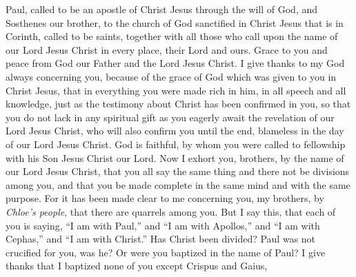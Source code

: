 
\begin{biblechapter} %
 Paul, called to be an apostle of Christ Jesus through the will of God, and Sosthenes our brother,
\verse to the church of God sanctified in Christ Jesus that is in Corinth, called to be saints, together with all those who call upon the name of our Lord Jesus Christ in every place, their Lord and ours.
\verse Grace to you and peace from God our Father and the Lord Jesus Christ.
 I give thanks to my God always concerning you, because of the grace of God which was given to you in Christ Jesus,
\verse that in everything you were made rich in him, in all speech and all knowledge,
\verse just as the testimony about Christ has been confirmed in you,
\verse so that you do not lack in any spiritual gift as you eagerly await the revelation of our Lord Jesus Christ,
\verse who will also confirm you until the end, blameless in the day of our Lord Jesus Christ.
\verse God is faithful, by whom you were called to fellowship with his Son Jesus Christ our Lord.
 Now I exhort you, brothers, by the name of our Lord Jesus Christ, that you all say the same thing and there not be divisions among you, and that you be made complete in the same mind and with the same purpose.
\verse For it has been made clear to me concerning you, my brothers, by \textit{Chloe’s people}, that there are quarrels among you.
\verse But I say this, that each of you is saying, “I am with Paul,” and “I am with Apollos,” and “I am with Cephas,” and “I am with Christ.”
\verse Has Christ been divided? Paul was not crucified for you, was he? Or were you baptized in the name of Paul?
\verse I give thanks that I baptized none of you except Crispus and Gaius,

\end{biblechapter}
